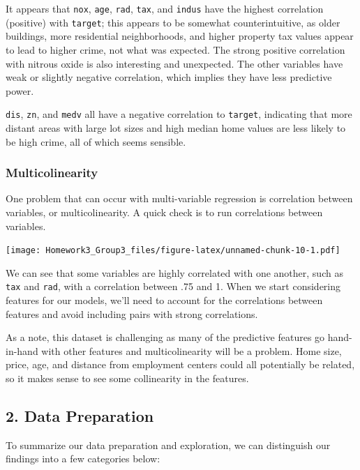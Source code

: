 \documentclass[
]{article}
\begin{document}
It appears that \texttt{nox}, \texttt{age}, \texttt{rad}, \texttt{tax},
and \texttt{indus} have the highest correlation (positive) with
\texttt{target}; this appears to be somewhat counterintuitive, as older
buildings, more residential neighborhoods, and higher property tax
values appear to lead to higher crime, not what was expected. The strong
positive correlation with nitrous oxide is also interesting and
unexpected. The other variables have weak or slightly negative
correlation, which implies they have less predictive power.

\texttt{dis}, \texttt{zn}, and \texttt{medv} all have a negative
correlation to \texttt{target}, indicating that more distant areas with
large lot sizes and high median home values are less likely to be high
crime, all of which seems sensible.

\hypertarget{multicolinearity}{%
\subsubsection{Multicolinearity}\label{multicolinearity}}

One problem that can occur with multi-variable regression is correlation
between variables, or multicolinearity. A quick check is to run
correlations between variables.

\texttt{[image: Homework3\_Group3\_files/figure-latex/unnamed-chunk-10-1.pdf]}

We can see that some variables are highly correlated with one another,
such as \texttt{tax} and \texttt{rad}, with a correlation between .75
and 1. When we start considering features for our models, we'll need to
account for the correlations between features and avoid including pairs
with strong correlations.

As a note, this dataset is challenging as many of the predictive
features go hand-in-hand with other features and multicolinearity will
be a problem. Home size, price, age, and distance from employment
centers could all potentially be related, so it makes sense to see some
collinearity in the features.

\hypertarget{data-preparation}{%
\subsection{2. Data Preparation}\label{data-preparation}}

To summarize our data preparation and exploration, we can distinguish
our findings into a few categories below:
\end{document}
